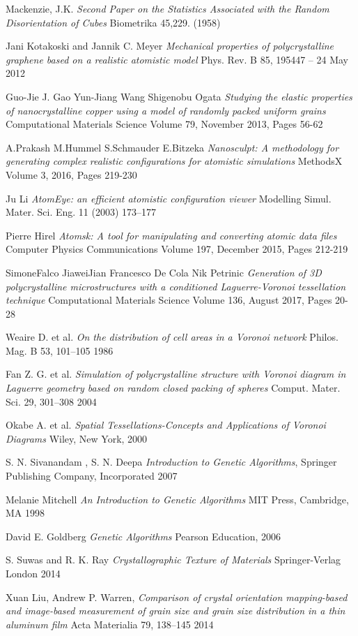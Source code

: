\documentclass[12pt]{report}
\begin{document}
\begin{thebibliography}{9}
  Mackenzie, J.K.
  \textit{Second Paper on the Statistics Associated with the Random Disorientation of Cubes}
  Biometrika 45,229.
 (1958)

  Jani Kotakoski and Jannik C. Meyer
  \textit{Mechanical properties of polycrystalline graphene based on a realistic atomistic model}
  Phys. Rev. B 85, 195447 – 24 May 2012

  Guo-Jie J. Gao  Yun-Jiang Wang Shigenobu Ogata
  \textit{Studying the elastic properties of nanocrystalline copper using a model of randomly packed uniform grains}
 Computational Materials Science
Volume 79, November 2013, Pages 56-62

  A.Prakash M.Hummel S.Schmauder E.Bitzeka
  \textit{Nanosculpt: A methodology for generating complex realistic configurations for atomistic simulations}
 MethodsX
Volume 3, 2016, Pages 219-230

  Ju Li
  \textit{AtomEye: an efficient atomistic configuration viewer}
 Modelling Simul. Mater. Sci. Eng. 11 (2003) 173–177

  Pierre Hirel
  \textit{Atomsk: A tool for manipulating and converting atomic data files}
 Computer Physics Communications
Volume 197, December 2015, Pages 212-219

  SimoneFalco JiaweiJian Francesco De Cola Nik Petrinic
  \textit{Generation of 3D polycrystalline microstructures with a conditioned Laguerre-Voronoi tessellation technique}
 Computational Materials Science
Volume 136, August 2017, Pages 20-28


  Weaire D. et al. 
  \textit{On the distribution of cell areas in a Voronoi network}
  Philos. Mag. B 53, 101–105 
  1986

  Fan Z. G. et al. 
  \textit{Simulation of polycrystalline structure with Voronoi diagram in Laguerre geometry    based on random closed packing of spheres} 
  Comput. Mater. Sci. 29, 301–308 
  2004

Okabe A. et al. 
\textit{Spatial Tessellations-Concepts and Applications of Voronoi Diagrams}
Wiley, New York, 
2000

  S. N. Sivanandam , S. N. Deepa
  \textit{Introduction to Genetic Algorithms},
  Springer Publishing Company, Incorporated
  2007

  Melanie Mitchell
  \textit{An Introduction to Genetic Algorithms}
  MIT Press, Cambridge, MA
 1998

  David E. Goldberg
  \textit{Genetic Algorithms}
  Pearson Education, 2006

  S. Suwas and R. K. Ray
  \textit{Crystallographic Texture of Materials}
  Springer-Verlag London 
  2014

  Xuan Liu, Andrew P. Warren,
  \textit{Comparison of crystal orientation mapping-based and image-based measurement of grain size and grain size distribution in a thin aluminum film}
  Acta Materialia 79, 138–145
  2014

\end{thebibliography}
\end{document}
